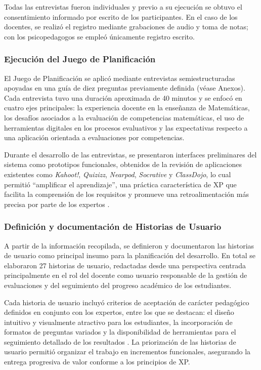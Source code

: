 Todas las entrevistas fueron individuales y previo a su ejecución se obtuvo el consentimiento informado por escrito de los participantes. En el caso de los docentes, se realizó el registro mediante grabaciones de audio y toma de notas; con los psicopedagogos se empleó únicamente registro escrito.

\subsubsection{Ejecución del Juego de Planificación}

El Juego de Planificación se aplicó mediante entrevistas semiestructuradas apoyadas en una guía de diez preguntas previamente definida (véase Anexos). Cada entrevista tuvo una duración aproximada de 40 minutos y se enfocó en cuatro ejes principales: la experiencia docente en la enseñanza de Matemáticas, los desafíos asociados a la evaluación de competencias matemáticas, el uso de herramientas digitales en los procesos evaluativos y las expectativas respecto a una aplicación orientada a evaluaciones por competencias.

Durante el desarrollo de las entrevistas, se presentaron interfaces preliminares del sistema como prototipos funcionales, obtenidos de la revisión de aplicaciones existentes como \textit{Kahoot!}, \textit{Quizizz}, \textit{Nearpod}, \textit{Socrative} y \textit{ClassDojo}, lo cual permitió ``amplificar el aprendizaje'', una práctica característica de XP que facilita la comprensión de los requisitos y promueve una retroalimentación más precisa por parte de los expertos \cite{beck2004xp}.

\subsubsection{Definición y documentación de Historias de Usuario}

A partir de la información recopilada, se definieron y documentaron las historias de usuario como principal insumo para la planificación del desarrollo. En total se elaboraron 27 historias de usuario, redactadas desde una perspectiva centrada principalmente en el rol del docente como usuario responsable de la gestión de evaluaciones y del seguimiento del progreso académico de los estudiantes.

Cada historia de usuario incluyó criterios de aceptación de carácter pedagógico definidos en conjunto con los expertos, entre los que se destacan: el diseño intuitivo y visualmente atractivo para los estudiantes, la incorporación de formatos de preguntas variados y la disponibilidad de herramientas para el seguimiento detallado de los resultados \cite{evans2020cbe,vlachogianni2022sus}. La priorización de las historias de usuario permitió organizar el trabajo en incrementos funcionales, asegurando la entrega progresiva de valor conforme a los principios de XP.

